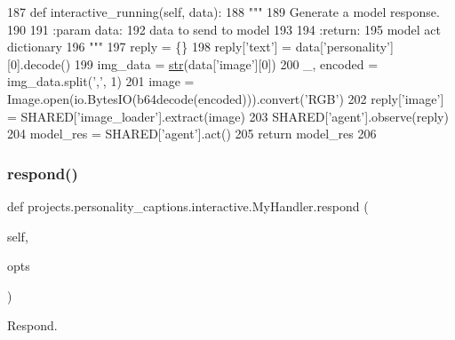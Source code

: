 \begin{DoxyCode}
187     \textcolor{keyword}{def }interactive\_running(self, data):
188         \textcolor{stringliteral}{"""}
189 \textcolor{stringliteral}{        Generate a model response.}
190 \textcolor{stringliteral}{}
191 \textcolor{stringliteral}{        :param data:}
192 \textcolor{stringliteral}{            data to send to model}
193 \textcolor{stringliteral}{}
194 \textcolor{stringliteral}{        :return:}
195 \textcolor{stringliteral}{            model act dictionary}
196 \textcolor{stringliteral}{        """}
197         reply = \{\}
198         reply[\textcolor{stringliteral}{'text'}] = data[\textcolor{stringliteral}{'personality'}][0].decode()
199         img\_data = \hyperlink{namespacegenerate__task__READMEs_a5b88452ffb87b78c8c85ececebafc09f}{str}(data[\textcolor{stringliteral}{'image'}][0])
200         \_, encoded = img\_data.split(\textcolor{stringliteral}{','}, 1)
201         image = Image.open(io.BytesIO(b64decode(encoded))).convert(\textcolor{stringliteral}{'RGB'})
202         reply[\textcolor{stringliteral}{'image'}] = SHARED[\textcolor{stringliteral}{'image\_loader'}].extract(image)
203         SHARED[\textcolor{stringliteral}{'agent'}].observe(reply)
204         model\_res = SHARED[\textcolor{stringliteral}{'agent'}].act()
205         \textcolor{keywordflow}{return} model\_res
206 
\end{DoxyCode}
\mbox{\label{classprojects_1_1personality__captions_1_1interactive_1_1MyHandler_a990c770086f0596dde94fc2a84e76d90}} 
\subsubsection{\texorpdfstring{respond()}{respond()}}
{\footnotesize\ttfamily def projects.\+personality\+\_\+captions.\+interactive.\+My\+Handler.\+respond (\begin{DoxyParamCaption}\item[{}]{self,  }\item[{}]{opts }\end{DoxyParamCaption})}

\begin{DoxyVerb}Respond.
\end{DoxyVerb}
 

